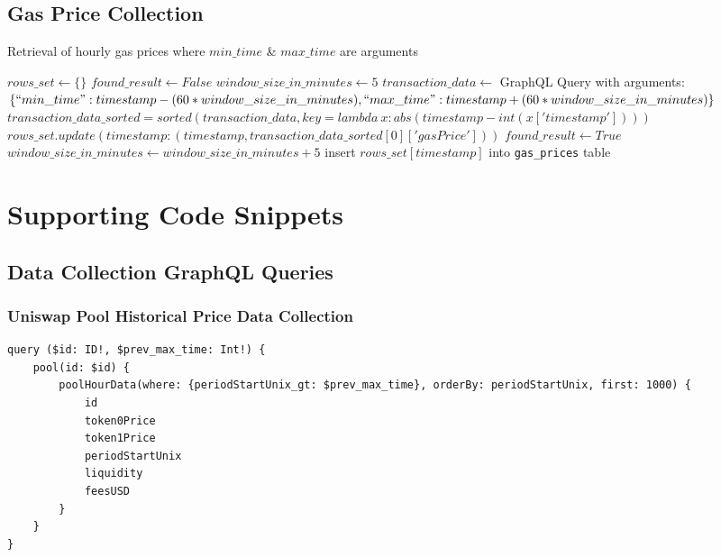 \section{Gas Price Collection}
\begin{algorithm}
    \caption{Retrieval of hourly gas prices where $min\_time$ \& $max\_time$ are arguments}\label{alg_gas_price_col}
    \begin{algorithmic}
        \State $rows\_set \leftarrow \{\}$
            \State $found\_result \leftarrow False$
            \State $window\_size\_in\_minutes \leftarrow 5$
                \State $transaction\_data \leftarrow$ GraphQL Query with arguments: $\{``min\_time": timestamp - (60 * window\_size\_in\_minutes), ``max\_time": timestamp + (60 * window\_size\_in\_minutes)\}$
                    \State $transaction\_data\_sorted = sorted(transaction\_data, key=lambda\ x:abs(timestamp - int(x['timestamp'])))$
                    \State $rows\_set.update({timestamp: (timestamp, transaction\_data\_sorted[0]['gasPrice'])})$
                    \State $found\_result \leftarrow True$
                \Else
                    \State $window\_size\_in\_minutes \leftarrow window\_size\_in\_minutes + 5$
                \EndIf
            \EndWhile
            \State insert $rows\_set[timestamp]$ into \texttt{gas\_prices} table
        \EndFor
    \end{algorithmic}
\end{algorithm}

\chapter{Supporting Code Snippets}

\section{Data Collection GraphQL Queries}

\subsection{Uniswap Pool Historical Price Data Collection}

\begin{lstlisting}[caption={GraphQL query to collect for pool pricing data \label{app:pool-query}},captionpos=b]
query ($id: ID!, $prev_max_time: Int!) {
    pool(id: $id) {
        poolHourData(where: {periodStartUnix_gt: $prev_max_time}, orderBy: periodStartUnix, first: 1000) {
            id
            token0Price
            token1Price
            periodStartUnix
            liquidity
            feesUSD
        }
    }
}
\end{lstlisting}

